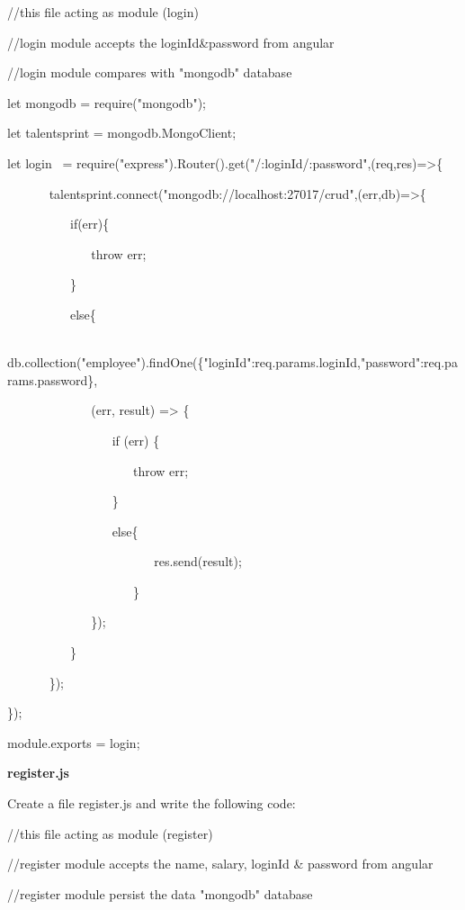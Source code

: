 \documentclass[
]{article}
\begin{document}
//this file acting as module (login)

//login module accepts the loginId\&password from angular

//login module compares with "mongodb" database

\hfill    

let mongodb = require("mongodb");

let talentsprint = mongodb.MongoClient; {~}

\hfill    

let login{~ }=
require("express").Router().get("/:loginId/:password",(req,res)=\textgreater\{

{~ ~ ~ ~
}talentsprint.connect("mongodb://localhost:27017/crud",(err,db)=\textgreater\{

{~ ~ ~ ~ ~ ~ }if(err)\{

{~ ~ ~ ~ ~ ~ ~ ~ }throw err;

{~ ~ ~ ~ ~ ~ }\}

{~ ~ ~ ~ ~ ~ }else\{

{~ ~ ~ ~ ~ ~ ~ ~
}db.collection("employee").findOne(\{"loginId":req.params.loginId,"password":req.params.password\},{~}

{~ ~ ~ ~ ~ ~ ~ ~ }(err, result) =\textgreater{} \{

{~ ~ ~ ~ ~ ~ ~ ~ ~ ~ }if (err) \{

{~ ~ ~ ~ ~ ~ ~ ~ ~ ~ ~ ~ }throw err;

{~ ~ ~ ~ ~ ~ ~ ~ ~ ~ }\}

{~ ~ ~ ~ ~ ~ ~ ~ ~ ~ }else\{

{~ ~ ~ ~ ~ ~ ~ ~ ~ ~ ~ ~ ~ ~ }res.send(result); {~ ~ ~ ~ ~ ~ ~ ~ ~ ~}

{~ ~ ~ ~ ~ ~ ~ ~ ~ ~ ~ ~ }\}

{~ ~ ~ ~ ~ ~ ~ ~ }\});

{~ ~ ~ ~ ~ ~ }\}

{~ ~ ~ ~ }\});

\});

module.exports = login;

\hfill    
\newpage

{\textbf{register.js}}

Create a file register.js and write the following code:

//this file acting as module (register)

//register module accepts the name, salary, loginId \& password from
angular

//register module persist the data "mongodb" database

\hfill    
\end{document}
